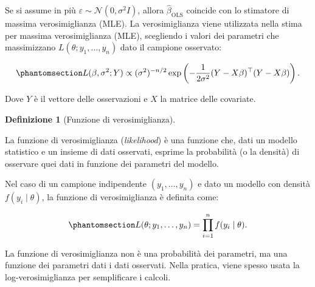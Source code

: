 \documentclass[
  italian,
  a4paper,
  a4paper,
  twoside,
  open=right,
  12pt]{scrbook}
\theoremstyle{definition}
\newtheorem{definition}{Definizione}[chapter]
\theoremstyle{remark}
\begin{document}
Se si assume in più \(\varepsilon \sim \mathcal{N}(0,\sigma^2 I)\),
allora \(\hat\beta_{\mathrm{OLS}}\) coincide con lo stimatore di massima
verosimiglianza (MLE). La verosimiglianza viene utilizzata nella stima
per massima verosimiglianza (MLE), scegliendo i valori dei parametri che
massimizzano \(L(\theta; y_1, \ldots, y_n)\) dato il campione osservato:

\begin{equation}\phantomsection\label{eq-likelihood_normal}{
L(\beta, \sigma^2; Y) \propto (\sigma^2)^{-n/2}
\exp \left( -\frac{1}{2\sigma^2} (Y - X\beta)^\top (Y - X\beta) \right ).
}\end{equation}

Dove \(Y\) è il vettore delle osservazioni e \(X\) la matrice delle
covariate.

\begin{definition}[Funzione di
verosimiglianza]\protect\hypertarget{def-verosimiglianza}{}\label{def-verosimiglianza}

La funzione di verosimiglianza (\emph{likelihood}) è una funzione che,
dati un modello statistico e un insieme di dati osservati, esprime la
probabilità (o la densità) di osservare quei dati in funzione dei
parametri del modello.

Nel caso di un campione indipendente \((y_1, \ldots, y_n)\) e dato un
modello con densità \(f(y_i \mid \theta)\), la funzione di
verosimiglianza è definita come:

\begin{equation}\phantomsection\label{eq-likelihood_simple}{
L(\theta; y_1, \ldots, y_n) = \prod_{i=1}^n f(y_i \mid \theta).
}\end{equation}

\end{definition}

La funzione di verosimiglianza non è una probabilità dei parametri, ma
una funzione dei parametri dati i dati osservati. Nella pratica, viene
spesso usata la log-verosimiglianza per semplificare i calcoli.
\end{document}
